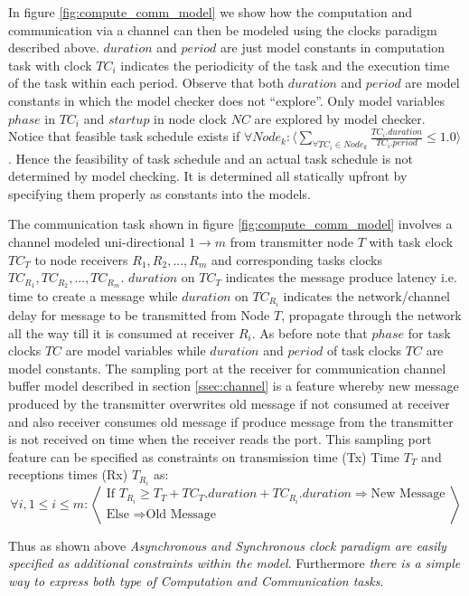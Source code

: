 In figure \ref{fig:compute_comm_model} we show how the computation and communication via a channel can then be modeled using the clocks paradigm described above. $duration$ and $period$ are just model constants in computation task with clock $TC_i$ indicates the periodicity of the task and the execution time of the task within each period. Observe that both $duration$ and $period$ are model constants in which the model checker does not “explore”. Only model variables $phase$ in $TC_i$ and $startup$ in node clock $NC$ are explored by model checker. Notice that feasible task schedule exists if $\forall Node_k: \langle \sum_{\forall TC_i \in Node_k} \frac{TC_i.duration}{TC_i.period} \leq 1.0 \rangle$. Hence the feasibility of task schedule and an actual task schedule is not determined by model checking. It is determined all statically upfront by specifying them properly as constants into the models.

The communication task shown in figure \ref{fig:compute_comm_model} involves a channel modeled uni-directional $1 \rightarrow m$ from transmitter node $T$ with task clock $TC_T$ to node receivers $R_1,R_2,...,R_m$ and corresponding tasks clocks $TC_{R_1},TC_{R_2},...,TC_{R_m}$. $duration$ on $TC_T$ indicates the message produce latency i.e. time to create a message while $duration$ on $TC_{R_i}$ indicates the network/channel delay for message to be transmitted from Node $T$, propagate through the network all the way till it is consumed at receiver $R_i$. As before note that $phase$ for task clocks $TC$ are model variables while $duration$ and $period$ of task clocks $TC$ are model constants. The sampling port at the receiver for communication channel buffer model described in section \ref{ssec:channel} is a feature whereby new message produced by the transmitter overwrites old message if not consumed at receiver and also receiver consumes old message if produce message from the transmitter  is not received on time when the receiver reads the port.  This sampling port feature can be specified as constraints on transmission time (Tx) Time $T_T$ and receptions times (Rx) $T_{R_i}$ as:
\begin{equation*}\forall i, 1 \leq i \leq m: \left< \begin{array}{l} \text{If } T_{R_i} \geq T_T + TC_T.duration + TC_{R_i}.duration \Longrightarrow \text{New Message} \\ \text{Else } \Longrightarrow \text{Old Message} \end{array} \right> \end{equation*}

Thus as shown above \emph{Asynchronous and Synchronous clock paradigm are easily specified as additional constraints within the model}. Furthermore \emph{there is a simple way to express both type of Computation and Communication tasks}.




